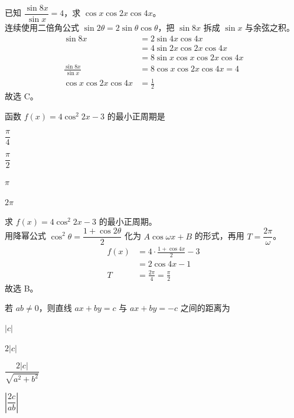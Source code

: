 \begin{solution}
    已知 $\dfrac{\sin 8x}{\sin x}=4$，求 $\cos x\cos 2x\cos 4x$。\\
    连续使用二倍角公式 $\sin 2\theta=2\sin\theta\cos\theta$，把 $\sin 8x$ 拆成 $\sin x$ 与余弦之积。\\
    \begin{align*}
        \sin 8x &=2\sin 4x\cos 4x \\
        &=4\sin 2x\cos 2x\cos 4x \\
        &=8\sin x\cos x\cos 2x\cos 4x \\
        \frac{\sin 8x}{\sin x} &=8\cos x\cos 2x\cos 4x=4 \\
        \cos x\cos 2x\cos 4x &=\frac{1}{2}
    \end{align*}
    故选 C。
\end{solution}

\begin{question}
    函数 $f(x)=4\cos^2 2x-3$ 的最小正周期是 \paren[B]
    \begin{choices}
        \item $\dfrac{\pi}{4}$
        \item $\dfrac{\pi}{2}$
        \item $\pi$
        \item $2\pi$
    \end{choices}
\end{question}

\begin{solution}
    求 $f(x)=4\cos^2 2x-3$ 的最小正周期。\\
    用降幂公式 $\cos^2\theta=\dfrac{1+\cos2\theta}{2}$ 化为 $A\cos\omega x+B$ 的形式，再用 $T=\dfrac{2\pi}{\omega}$。\\
    \begin{align*}
        f(x) &=4\cdot\frac{1+\cos 4x}{2}-3 \\
        &=2\cos 4x-1 \\
        T &=\frac{2\pi}{4}=\frac{\pi}{2}
    \end{align*}
    故选 B。
\end{solution}

\begin{question}
    若 $ab\neq0$，则直线 $ax+by=c$ 与 $ax+by=-c$ 之间的距离为 \paren[C]
    \begin{choices}
        \item $|c|$
        \item $2|c|$
        \item $\dfrac{2|c|}{\sqrt{a^2+b^2}}$
        \item $\left|\dfrac{2c}{ab}\right|$
    \end{choices}
\end{question}

